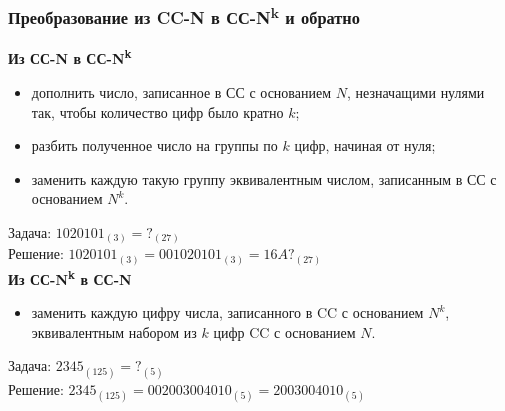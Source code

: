 \documentclass{beamer}
\begin{document}
\begin{frame}
\frametitle{Преобразование из CC-N в СС-N\textsuperscript{k} и обратно}
\textbf{Из СС-N в СС-N\textsuperscript{k}}
\begin{itemize}
    [circle]
    \item дополнить число, записанное в СС с основанием $N$, незначащими нулями так, чтобы количество цифр было кратно $k$;
    \item разбить полученное число на группы по $k$ цифр, начиная от нуля;
    \item заменить каждую такую группу эквивалентным числом, записанным в СС с основанием $N^k$.
\end{itemize}
{\small
Задача: $1020101_{(3)} = ?_{(27)}$\\
Решение: $1020101_{(3)} = 001 020 101_{(3)} = 16A?_{(27)}$
}\\
\textbf{Из СС-N\textsuperscript{k} в СС-N}
\begin{itemize}
    [circle]
    \item заменить каждую цифру числа, записанного в CC с основанием $N^k$, эквивалентным набором из $k$ цифр CC с основанием $N$.
\end{itemize}
{\small
Задача: $2345_{(125)} = ?_{(5)}$\\
Решение: $2345_{(125)} = 002 003 004 010_{(5)} = 2003004010_{(5)}$
}
\end{frame}
\end{document}
